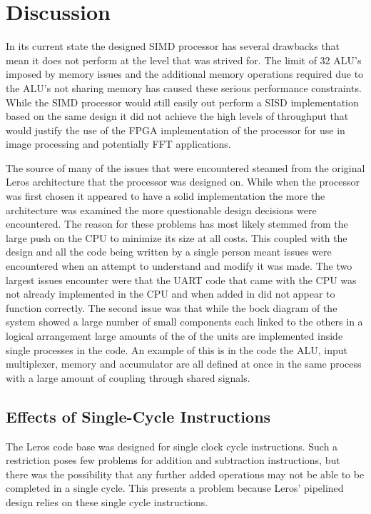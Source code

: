 \section{Discussion}
In its current state the designed SIMD processor has several drawbacks that mean
it does not perform at the level that was strived for. The limit of 32 ALU's
imposed by memory issues and the additional memory operations required due to
the ALU's not sharing memory has caused these serious performance constraints.
While the SIMD processor would still easily out perform a SISD implementation
based on the same design it did not achieve the high levels of throughput that
would justify the use of the FPGA implementation of the processor for use in
image processing and potentially FFT applications.  

The source of many of the issues that were encountered steamed from the original
Leros architecture that the processor was designed on. While when the processor
was first chosen it appeared to have a solid implementation the more the
architecture was examined the more questionable design decisions were
encountered. The reason for these problems has most likely stemmed from the
large push on the CPU to minimize its size at all costs. This coupled with the
design and all the code being written by a single person meant issues were
encountered when an attempt to understand and modify it was made. The two
largest issues encounter were that the UART code that came with the CPU was not
already implemented in the CPU and when added in did not appear to function
correctly. The second issue was that while the bock diagram of the system showed
a large number of small components each linked to the others in a logical
arrangement large amounts of the of the units are implemented inside single
processes in the code. An example of this is in the code the ALU, input
multiplexer, memory and accumulator are all defined at once in the same process
with a large amount of coupling through shared signals.  

\subsection{Effects of Single-Cycle Instructions}
The Leros code base was designed for single clock cycle instructions. Such a
restriction poses few problems for addition and subtraction instructions, but
there was the possibility that any further added operations may not be able to be
completed in a single cycle. This presents a problem because Leros' pipelined
design relies on these single cycle instructions.

